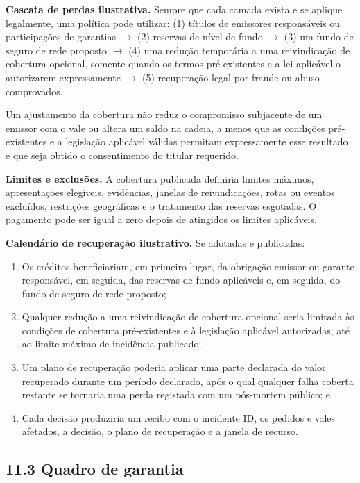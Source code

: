 \documentclass[11pt]{article}
\begin{document}
\textbf{Cascata de perdas ilustrativa.} Sempre que cada camada exista e se aplique legalmente, uma política pode utilizar: (1) títulos de emissores responsáveis ou participações de garantias $\to$ (2) reservas de nível de fundo $\to$ (3) um fundo de seguro de rede proposto $\to$ (4) uma redução temporária a uma reivindicação de cobertura opcional, somente quando os termos pré-existentes e a lei aplicável o autorizarem expressamente $\to$ (5) recuperação legal por fraude ou abuso comprovados.

Um ajustamento da cobertura não reduz o compromisso subjacente de um emissor com o vale ou altera um saldo na cadeia, a menos que as condições pré-existentes e a legislação aplicável válidas permitam expressamente esse resultado e que seja obtido o consentimento do titular requerido.

\textbf{Limites e exclusões.} A cobertura publicada definiria limites máximos, apresentações elegíveis, evidências, janelas de reivindicações, rotas ou eventos excluídos, restrições geográficas e o tratamento das reservas esgotadas. O pagamento pode ser igual a zero depois de atingidos os limites aplicáveis.

\textbf{Calendário de recuperação ilustrativo.} Se adotadas e publicadas:

\begin{enumerate}[leftmargin=*]
\item Os créditos beneficiariam, em primeiro lugar, da obrigação emissor ou garante responsável, em seguida, das reservas de fundo aplicáveis e, em seguida, do fundo de seguro de rede proposto;
\item Qualquer redução a uma reivindicação de cobertura opcional seria limitada às condições de cobertura pré-existentes e à legislação aplicável autorizadas, até ao limite máximo de incidência publicado;
\item Um plano de recuperação poderia aplicar uma parte declarada do valor recuperado durante um período declarado, após o qual qualquer falha coberta restante se tornaria uma perda registada com um pós-mortem público; e
\item Cada decisão produziria um recibo com o incidente ID, os pedidos e vales afetados, a decisão, o plano de recuperação e a janela de recurso.
\end{enumerate}
\subsection*{11.3 Quadro de garantia}
\end{document}
